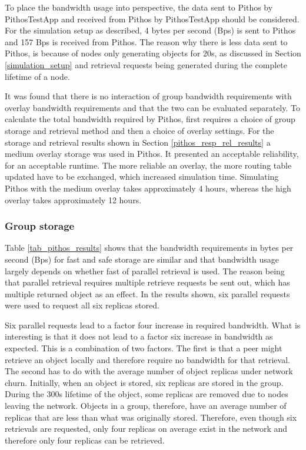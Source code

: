 To place the bandwidth usage into perspective, the data sent to Pithos by PithosTestApp and received from Pithos by PithosTestApp should be considered. For the simulation setup as described, 4 bytes per second (Bps) is sent to Pithos and 157 Bps is received from Pithos. The reason why there is less data sent to Pithos, is because of nodes only generating objects for 20s, as discussed in Section \ref{simulation_setup} and retrieval requests being generated during the complete lifetime of a node.

It was found that there is no interaction of group bandwidth requirements with overlay bandwidth requirements and that the two can be evaluated separately. To calculate the total bandwidth required by Pithos, first requires a choice of group storage and retrieval method and then a choice of overlay settings. For the storage and retrieval results shown in Section \ref{pithos_resp_rel_results} a medium overlay storage was used in Pithos. It presented an acceptable reliability, for an acceptable runtime. The more reliable an overlay, the more routing table updated have to be exchanged, which increased simulation time. Simulating Pithos with the medium overlay takes approximately 4 hours, whereas the high overlay takes approximately 12 hours.

\subsubsection{Group storage}
Table \ref{tab_pithos_results} shows that the bandwidth requirements in bytes per second (Bps) for fast and safe storage are similar and that bandwidth usage largely depends on whether fast of parallel retrieval is used. The reason being that parallel retrieval requires multiple retrieve requests be sent out, which has multiple returned object as an effect. In the results shown, six parallel requests were used to request all six replicas stored.

Six parallel requests lead to a factor four increase in required bandwidth. What is interesting is that it does not lead to a factor six increase in bandwidth as expected. This is a combination of two factors.  The first is that a peer might retrieve an object locally and therefore require no bandwidth for that retrieval. The second has to do with the average number of object replicas under network churn. Initially, when an object is stored, six replicas are stored in the group. During the 300s lifetime of the object, some replicas are removed due to nodes leaving the network. Objects in a group, therefore, have an average number of replicas that are less than what was originally stored. Therefore, even though six retrievals are requested, only four replicas on average exist in the network and therefore only four replicas can be retrieved.

